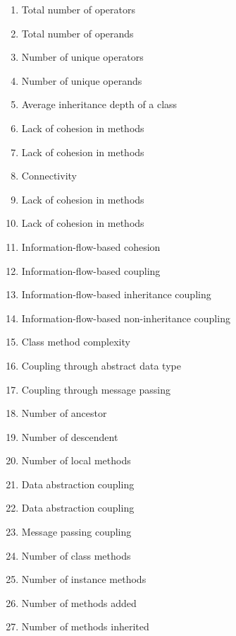\documentclass{article}
\begin{document}
{\begin{pptWide}{5}
\begin{enumerate}
\item \textbf{} Total number of operators
\item \textbf{} Total number of operands
\item \textbf{} Number of unique operators
\item \textbf{} Number of unique operands
\item \textbf{} Average inheritance depth of a class
\item \textbf{} Lack of cohesion in methods
\item \textbf{} Lack of cohesion in methods
\item \textbf{} Connectivity
\item \textbf{} Lack of cohesion in methods
\item \textbf{} Lack of cohesion in methods
\item \textbf{} Information-flow-based cohesion
\item \textbf{} Information-flow-based coupling
\item \textbf{} Information-flow-based inheritance coupling
\item \textbf{} Information-flow-based non-inheritance coupling
\item \textbf{} Class method complexity
\item \textbf{} Coupling through abstract data type
\item \textbf{} Coupling through message passing
\item \textbf{} Number of ancestor
\item \textbf{} Number of descendent
\item \textbf{} Number of local methods
\item \textbf{} Data abstraction coupling
\item \textbf{} Data abstraction coupling
\item \textbf{} Message passing coupling
\item \textbf{} Number of class methods
\item \textbf{} Number of instance methods
\item \textbf{} Number of methods added
\item \textbf{} Number of methods inherited

\end{enumerate}
\end{pptWide}}
\end{document}
